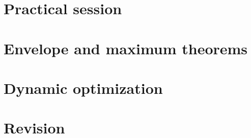 \documentclass[letterpaper,10pt,english]{jupyterBook}
\begin{document}
\sphinxstepscope


\chapter{Practical session}
\label{\detokenize{09.practical_session:practical-session}}\label{\detokenize{09.practical_session::doc}}

\sphinxstepscope


\chapter{Envelope and maximum theorems}
\label{\detokenize{10.envelope_maximum:envelope-and-maximum-theorems}}\label{\detokenize{10.envelope_maximum::doc}}

\sphinxstepscope


\chapter{Dynamic optimization}
\label{\detokenize{11.dynamic:dynamic-optimization}}\label{\detokenize{11.dynamic::doc}}

\sphinxstepscope


\chapter{Revision}
\label{\detokenize{12.revision:revision}}\label{\detokenize{12.revision::doc}}

\sphinxstepscope
\end{document}
